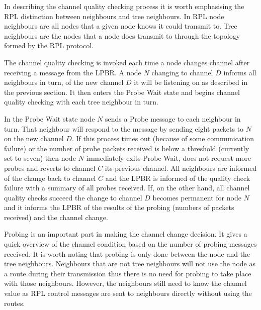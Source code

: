 In describing the channel quality checking process it is worth emphasising the RPL distinction between neighbours and tree neighbours. In RPL node neighbours are all nodes that a given node knows it could transmit to. Tree neighbours are the nodes that a node does transmit to through the topology formed by the RPL protocol.

The channel quality checking is invoked each time a node changes channel after receiving a message from the LPBR. A node $N$ changing to channel $D$ informs all neighbours in turn, of the new channel $D$ it will be listening on as described in the previous section. It then enters the Probe Wait state and begins channel quality checking with each tree neighbour in turn.  

In the Probe Wait state node $N$ sends a Probe message to each neighbour in turn. That neighbour will respond
to the message by sending eight packets to $N$ on the new channel $D$. If this process times out (because of some communication failure) or the number of probe packets received is below a threshold (currently set to
seven) then node $N$ immediately exits Probe Wait, does not request more probes and reverts to channel $C$ its
previous channel. All neighbours are informed of the change back to channel $C$ and the LPBR is informed of
the quality check failure with a summary of all probes received.
If, on the other hand, all channel quality checks succeed the change to channel $D$ becomes permanent for node $N$ and it informs the LPBR of the results of the probing (numbers of packets received) and the channel change.

Probing is an important part in making the channel change decision. It gives a quick overview of the channel condition based on the number of probing messages received. It is worth noting that probing is only done between the node and the tree neighbours. Neighbours that are not tree neighbours will not use the node as a route during their transmission thus there is no need for probing to take place with those neighbours. However, the neighbours still need to know the channel value as RPL control messages are sent to neighbours directly without using the routes.



